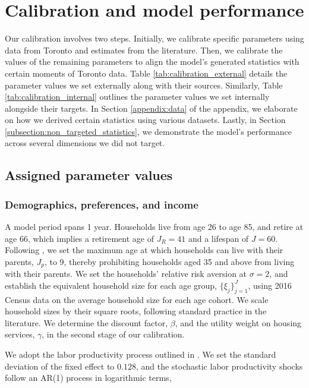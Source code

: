 \documentclass[parskip=full]{article}
\begin{document}
\section{Calibration and model performance}\label{sec:calibration}

Our calibration involves two steps. Initially, we calibrate specific parameters using data from Toronto and estimates from the literature. Then, we calibrate the values of the remaining parameters to align the model's generated statistics with certain moments of Toronto data. Table \ref{tab:calibration_external} details the parameter values we set externally along with their sources. Similarly, Table \ref{tab:calibration_internal} outlines the parameter values we set internally alongside their targets. In Section \ref{appendix:data} of the appendix, we elaborate on how we derived certain statistics using various datasets. Lastly, in Section \ref{subsection:non_targeted_statistics}, we demonstrate the model's performance across several dimensions we did not target.

\subsection{Assigned parameter values}

\subsubsection{Demographics, preferences, and income}
A model period spans 1 year. Households live from age 26 to age 85, and retire at age 66, which implies a retirement age of $J_{R}=41$ and a lifespan of $J=60$. Following \citet{rs-2023}, we set the maximum age at which households can live with their parents, $J_{p}$, to 9, thereby prohibiting households aged 35 and above from living with their parents. We set the households' relative risk aversion at $\sigma=2$, and establish the equivalent household size for each age group, $\{\xi_{j}\}_{j=1}^{J}$, using 2016 Census data on the average household size for each age cohort. We scale household sizes by their square roots, following standard practice in the literature. We determine the discount factor, $\beta$, and the utility weight on housing services, $\gamma$, in the second stage of our calibration.

We adopt the labor productivity process outlined in \citet{gkkoc}. We set the standard deviation of the fixed effect to $0.128$, and the stochastic labor productivity shocks follow an AR(1) process in logarithmic terms,
\end{document}
